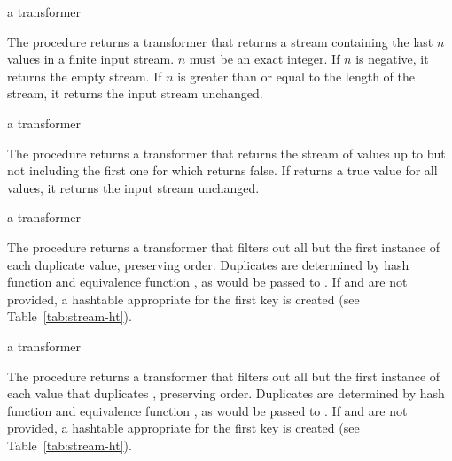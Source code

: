 \begin{procedure}
\end{procedure}
\returns{} a transformer

The  procedure returns a transformer that returns a stream containing
the last $n$ values in a finite input stream. $n$ must be an exact integer. If $n$ is
negative, it returns the empty stream. If $n$ is greater than or equal to the length of
the stream, it returns the input stream unchanged.

\begin{procedure}
\end{procedure}
\returns{} a transformer

The  procedure returns a transformer that returns the stream of values
up to but not including the first one for which  returns false. If
 returns a true value for all values, it returns the input stream
unchanged.

\begin{procedure}
\end{procedure}
\returns{} a transformer

The  procedure returns a transformer that filters out all but the first
instance of each duplicate value, preserving order. Duplicates are determined by hash
function  and equivalence function , as would be passed to
. If  and  are not provided, a hashtable
appropriate for the first key is created (see Table~\ref{tab:stream-ht}).

\begin{procedure}
\end{procedure}
\returns{} a transformer

The  procedure returns a transformer that filters out all but the first
instance of each value  that duplicates ,
preserving order. Duplicates are determined by hash function  and equivalence
function , as would be passed to . If  and
 are not provided, a hashtable appropriate for the first key is created (see
Table~\ref{tab:stream-ht}).

